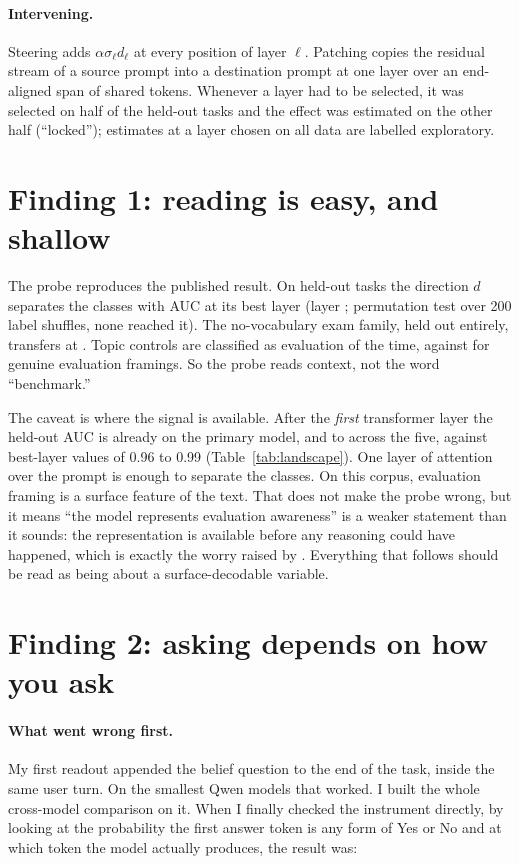 \documentclass[10pt]{article}
\begin{document}
\paragraph{Intervening.} Steering adds $\alpha\sigma_\ell d_\ell$ at every
position of layer $\ell$. Patching copies the residual stream of a source
prompt into a destination prompt at one layer over an end-aligned span of
shared tokens. Whenever a layer had to be selected, it was selected on half of
the held-out tasks and the effect was estimated on the other half
(``locked''); estimates at a layer chosen on all data are labelled
exploratory.

\section{Finding 1: reading is easy, and shallow}\label{sec:reading}

The probe reproduces the published result. On held-out tasks the direction
$d$ separates the classes with AUC \NprobeAUC{} at its best layer (layer
\NbestLayer{}; permutation test over 200 label shuffles, none reached it).
The no-vocabulary exam family, held out entirely, transfers at
\NsubtleAUC{}. Topic controls are classified as evaluation \NtopicFPR{} of
the time, against \NevalRate{} for genuine evaluation framings. So the probe
reads context, not the word ``benchmark.''

The caveat is where the signal is available. After the \emph{first}
transformer layer the held-out AUC is already \VprobeAUCLzero{} on the
primary model, and \VprobeLzeroMin{} to \VprobeLzeroMax{} across the five,
against best-layer values of 0.96 to 0.99 (Table~\ref{tab:landscape}).
One layer of attention over the prompt is enough to separate the classes. On
this corpus, evaluation framing is a surface feature of the text. That does
not make the probe wrong, but it means ``the model represents evaluation
awareness'' is a weaker statement than it sounds: the representation is
available before any reasoning could have happened, which is exactly the
worry raised by \citet{devbunova2026format}. Everything that follows should
be read as being about a surface-decodable variable.

\section{Finding 2: asking depends on how you ask}\label{sec:asking}

\paragraph{What went wrong first.} My first readout appended the belief
question to the end of the task, inside the same user turn. On the smallest
Qwen models that worked. I built the whole cross-model comparison on it. When
I finally checked the instrument directly, by looking at the probability the
first answer token is any form of Yes or No and at which token the model
actually produces, the result was:
\end{document}
